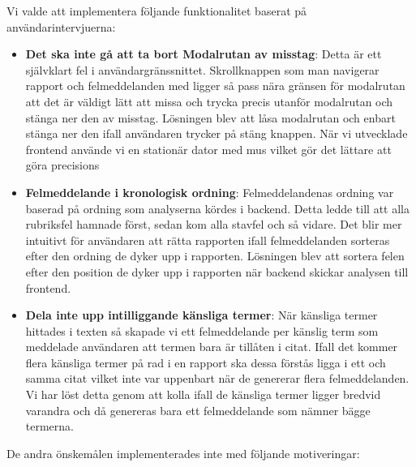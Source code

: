 \documentclass[swedish]{maucsthesis}
\begin{document}
Vi valde att implementera följande funktionalitet baserat på
användarintervjuerna:

\begin{itemize}
\item \textbf{Det ska inte gå att ta bort Modalrutan av misstag}: Detta är ett
  självklart fel i användargränssnittet. Skrollknappen som man navigerar
  rapport och felmeddelanden med ligger så pass nära gränsen för modalrutan att
  det är väldigt lätt att missa och trycka precis utanför modalrutan och stänga
  ner den av misstag. Lösningen blev att låsa modalrutan och enbart stänga ner
  den ifall användaren trycker på stäng knappen. När vi utvecklade frontend
  använde vi en stationär dator med mus vilket gör det lättare att göra precisions
\item \textbf{Felmeddelande i kronologisk ordning}: Felmeddelandenas ordning var
  baserad på ordning som analyserna kördes i backend. Detta ledde till att alla
  rubriksfel hamnade först, sedan kom alla stavfel och så vidare. Det blir mer
  intuitivt för användaren att rätta rapporten ifall felmeddelanden sorteras
  efter den ordning de dyker upp i rapporten. Lösningen blev att sortera felen
  efter den position de dyker upp i rapporten när backend skickar analysen till
  frontend.
\item \textbf{Dela inte upp intilliggande känsliga termer}: När känsliga termer
  hittades i texten så skapade vi ett felmeddelande per känslig term som
  meddelade användaren att termen bara är tillåten i citat. Ifall det kommer
  flera känsliga termer på rad i en rapport ska dessa förstås ligga i ett och
  samma citat vilket inte var uppenbart när de genererar flera felmeddelanden.
  Vi har löst detta genom att kolla ifall de känsliga termer ligger bredvid
  varandra och då genereras bara ett felmeddelande som nämner bägge termerna.
\end{itemize}

De andra önskemålen implementerades inte med följande motiveringar:
\end{document}
